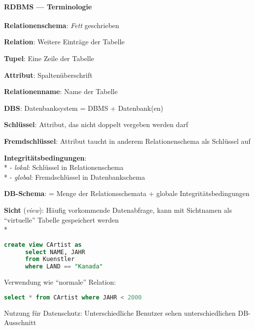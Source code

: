 \paragraph{RDBMS --- Terminologie}
\begin{items}
  \item \textbf{Relationenschema}: \emph{Fett} geschrieben
  \item \textbf{Relation}: Weitere Einträge der Tabelle
  \item \textbf{Tupel}: Eine Zeile der Tabelle
  \item \textbf{Attribut}: Spaltenüberschrift
  \item \textbf{Relationenname}: Name der Tabelle
  \item \textbf{DBS}: Datenbanksystem = DBMS + Datenbank(en)
  \item \textbf{Schlüssel}: Attribut, das nicht doppelt vergeben werden darf
  \item \textbf{Fremdschlüssel}: Attribut taucht in anderem Relationenschema als Schlüssel auf
  \item \textbf{Integritätsbedingungen}: \\*
    - \emph{lokal}: Schlüssel in Relationenschema \\*
    - \emph{global}: Fremdschlüssel in Datenbankschema
  \item \textbf{DB-Schema}: = Menge der Relationsschemata + globale Integritätsbedingungen
  \item \textbf{Sicht} (\emph{view}): Häufig vorkommende Datenabfrage, kann mit Sichtnamen als "`virtuelle"' Tabelle gespeichert werden \\*
  \begin{lstlisting}[language=sql]
    create view CArtist as
      select NAME, JAHR
      from Kuenstler
      where LAND == "Kanada"
  \end{lstlisting}
  \item Verwendung wie "`normale"' Relation:
  \begin{lstlisting}[language=sql]
    select * from CArtist where JAHR < 2000
  \end{lstlisting}
  \item Nutzung für Datenschutz: Unterschiedliche Benutzer sehen unterschiedlichen DB-Ausschnitt
\end{items}



